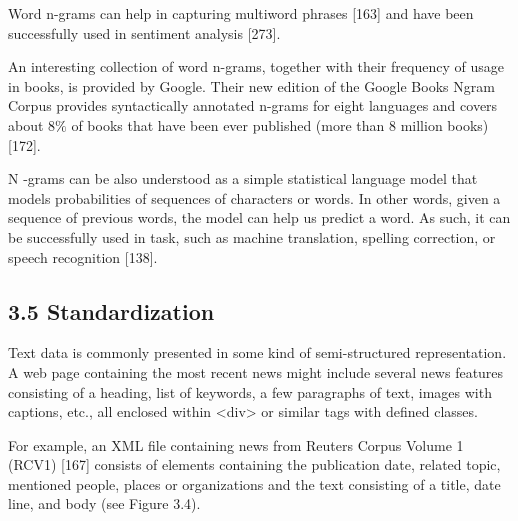 \documentclass[10pt]{book}
\begin{document}
Word n-grams can help in capturing multiword phrases [163] and have been successfully used in sentiment analysis [273].

An interesting collection of word n-grams, together with their frequency of usage in books, is provided by Google. Their new edition of the Google Books Ngram Corpus provides syntactically annotated n-grams for eight languages and covers about $8 \%$ of books that have been ever published (more than 8 million books) [172].

N -grams can be also understood as a simple statistical language model that models probabilities of sequences of characters or words. In other words, given a sequence of previous words, the model can help us predict a word. As such, it can be successfully used in task, such as machine translation, spelling correction, or speech recognition [138].

\subsection*{3.5 Standardization}
Text data is commonly presented in some kind of semi-structured representation. A web page containing the most recent news might include several news features consisting of a heading, list of keywords, a few paragraphs of text, images with captions, etc., all enclosed within <div> or similar tags with defined classes.

For example, an XML file containing news from Reuters Corpus Volume 1 (RCV1) [167] consists of elements containing the publication date, related topic,\\
mentioned people, places or organizations and the text consisting of a title, date line, and body (see Figure 3.4).
\end{document}
